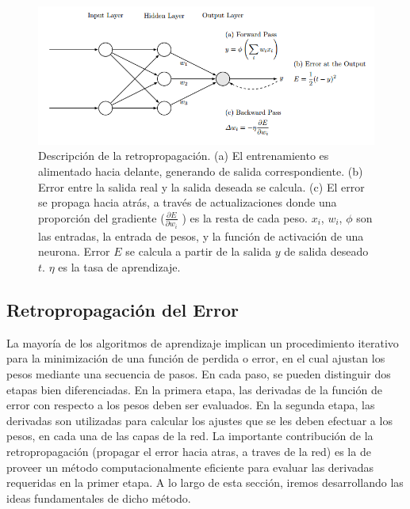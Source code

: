 \documentclass[a4paper,11pt,spanish]{book}
\begin{document}
	\begin{figure}[h]
	  \begin{center}
	  \includegraphics[width=0.8\linewidth]{./img/backprop.png}
	  \end{center}
	  \caption{ Descripción de la retropropagación. (a) El entrenamiento es alimentado hacia delante, generando de salida correspondiente. (b) Error entre la salida real y la salida deseada
	  se calcula. (c) El error se propaga hacia atrás, a través de actualizaciones donde una proporción del gradiente ($ \frac{\partial E}{\partial w_i}$ ) es la resta de cada peso. $x_i$, $w_i$, $\phi$ son las entradas,
	  la entrada de pesos, y la función de activación de una neurona. Error $E$ se calcula a partir de la salida $y$ de salida deseado $t$. $\eta$ es la tasa de aprendizaje.
	  \cite{Automatic_differentiation_ML} }
	  \label{fig:backprop}
	\end{figure}

      \subsection{Retropropagación del Error} \label{sec:backpropagation}
	La mayoría de los algoritmos de aprendizaje implican un procedimiento iterativo para la minimización de una función de perdida o error, en el cual ajustan los pesos mediante
	una secuencia de pasos. En cada paso, se pueden distinguir dos etapas bien diferenciadas. En la primera etapa, las derivadas de la función de error con
	respecto a los pesos deben ser evaluados. En la segunda etapa, las derivadas son utilizadas para calcular los ajustes que se les deben efectuar a los pesos, en cada una
	de las capas de la red. La importante contribución de la retropropagación (propagar el error hacia atras, a traves de la red) es la de proveer un
	método computacionalmente eficiente para evaluar las derivadas requeridas en la primer etapa. A lo largo de esta sección, iremos desarrollando las ideas fundamentales de dicho
	método.
\end{document}
